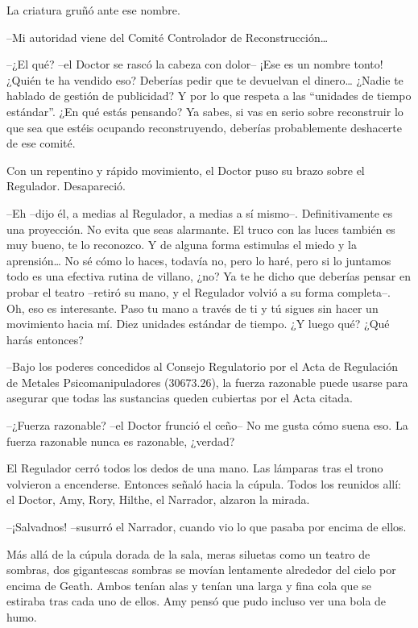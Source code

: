 {La criatura gruñó ante ese nombre.}

{--Mi autoridad viene del Comité Controlador de
	Reconstrucción\ldots{}}

{--¿El qué? --el Doctor se rascó la cabeza con dolor-- ¡Ese es un
	nombre tonto! ¿Quién te ha vendido eso? Deberías pedir que te devuelvan
	el dinero\ldots{} ¿Nadie te hablado de gestión de publicidad? Y por lo
	que respeta a las ``unidades de tiempo estándar''. ¿En qué estás
	pensando? Ya sabes, si vas en serio sobre reconstruir lo que sea que
	estéis ocupando reconstruyendo, deberías probablemente deshacerte de ese
comité.}

{Con un repentino y rápido movimiento, el Doctor puso su brazo sobre el
Regulador. Desapareció.}

{--Eh --dijo él, a medias al Regulador, a medias a sí mismo--.
	Definitivamente es una proyección. No evita que seas alarmante. El truco
	con las luces también es muy bueno, te lo reconozco. Y de alguna forma
	estimulas el miedo y la aprensión\ldots{} No sé cómo lo haces, todavía
	no, pero lo haré, pero si lo juntamos todo es una efectiva rutina de
	villano, ¿no? Ya te he dicho que deberías pensar en probar el teatro
	--retiró su mano, y el Regulador volvió a su forma completa--. Oh, eso
	es interesante. Paso tu mano a través de ti y tú sigues sin hacer un
	movimiento hacia mí. Diez unidades estándar de tiempo. ¿Y luego qué?
¿Qué harás entonces?}

{--Bajo los poderes concedidos al Consejo Regulatorio por el Acta de
	Regulación de Metales Psicomanipuladores (30673.26), la fuerza razonable
	puede usarse para asegurar que todas las sustancias queden cubiertas por
el Acta citada.}

{--¿Fuerza razonable? --el Doctor frunció el ceño-- No me gusta cómo
suena eso. La fuerza razonable nunca es razonable, ¿verdad?}

{El Regulador cerró todos los dedos de una mano. Las lámparas tras el
	trono volvieron a encenderse. Entonces señaló hacia la cúpula. Todos los
	reunidos allí: el Doctor, Amy, Rory, Hilthe, el Narrador, alzaron la
mirada.}

{--¡Salvadnos! --susurró el Narrador, cuando vio lo que pasaba por
encima de ellos.}

{Más allá de la cúpula dorada de la sala, meras siluetas como un teatro
	de sombras, dos gigantescas sombras se movían lentamente alrededor del
	cielo por encima de Geath. Ambos tenían alas y tenían una larga y fina
	cola que se estiraba tras cada uno de ellos. Amy pensó que pudo incluso
ver una bola de humo.}

